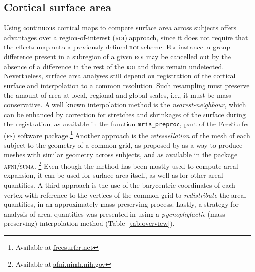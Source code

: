 \subsection{Cortical surface area}

Using continuous cortical maps to compare surface area across subjects offers advantages over a region-of-interest (\textsc{roi}) approach, since it does not require that the effects map onto a previously defined \textsc{roi} scheme. For instance, a group difference present in a subregion of a given \textsc{roi} may be cancelled out by the absence of a difference in the rest of the \textsc{roi} and thus remain undetected. Nevertheless, surface area analyses still depend on registration of the cortical surface and interpolation to a common resolution. Such resampling must preserve the amount of area at local, regional and global scales, i.e., it must be mass-conservative. A well known interpolation method is the \emph{nearest-neighbour}, which can be enhanced by correction for stretches and shrinkages of the surface during the registration, as available in the function \texttt{mris\_preproc}, part of the FreeSurfer (\textsc{fs}) software package.\footnote{Available at \href{http://freesurfer.net}{freesurfer.net}} Another approach is the \emph{retessellation} of the mesh of each subject to the geometry of a common grid, as proposed by \cite{Saad2004} as a way to produce meshes with similar geometry across subjects, and as available in the package \textsc{afni/suma}. \footnote{Available at \href{https://afni.nimh.nih.gov}{afni.nimh.nih.gov}} Even though the method has been mostly used to compute areal expansion, it can be used for surface area itself, as well as for other areal quantities. A third approach is the use of the barycentric coordinates of each vertex with reference to the vertices of the common grid to \emph{redistribute} the areal quantities, in an approximately mass preserving process. Lastly, a strategy for analysis of areal quantities was presented in \cite{Winkler2012} using a \emph{pycnophylactic} (mass-preserving) interpolation method (Table~\ref{tab:overview}).

